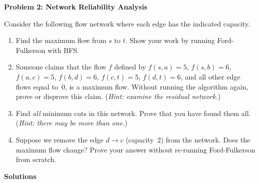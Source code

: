 \documentclass[11pt,a4paper]{article}
\begin{document}
\newpage

\textbf{\large Problem 2: Network Reliability Analysis}
\medskip

Consider the following flow network where each edge has the indicated capacity.

\begin{center}
\end{center}

\begin{enumerate}[label=(\alph*)]
  \item Find the maximum flow from $s$ to $t$. Show your work by running Ford-Fulkerson with BFS.

  \item Someone claims that the flow $f$ defined by $f(s,a)=5$, $f(s,b)=6$, $f(a,c)=5$, $f(b,d)=6$, $f(c,t)=5$, $f(d,t)=6$, and all other edge flows equal to~0, is a maximum flow. Without running the algorithm again, prove or disprove this claim. (\textit{Hint: examine the residual network.})

  \item Find \emph{all} minimum cuts in this network. Prove that you have found them all. (\textit{Hint: there may be more than one.})

  \item Suppose we remove the edge $d \to c$ (capacity~2) from the network. Does the maximum flow change? Prove your answer without re-running Ford-Fulkerson from scratch.
\end{enumerate}

\newpage

\begin{center}
{\Large\bfseries Solutions}
\end{center}
\end{document}

